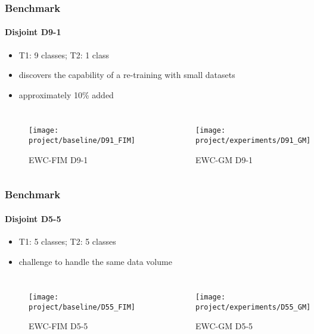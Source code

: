         \begin{frame}
            \frametitle{Benchmark}
            \framesubtitle{Disjoint D9-1}

            \begin{itemize}
                \item T1: 9 classes; T2: 1 class
                \item discovers the capability of a re-training with small datasets
                \item approximately 10\% added
            \end{itemize}

            \begin{columns}
                \begin{figure}[H]
                    \centering
                    \texttt{[image: project/baseline/D91\_FIM]}
                    \caption{EWC-FIM D9-1}
                    \label{fig:ewc_fim_d91}
                \end{figure}
                \begin{figure}[H]
                    \centering
                    \texttt{[image: project/experiments/D91\_GM]}
                    \caption{EWC-GM D9-1}
                    \label{fig:ewc_gm_d91}
                \end{figure}
            \end{columns}
        \end{frame}

        \begin{frame}
            \frametitle{Benchmark}
            \framesubtitle{Disjoint D5-5}
            
            \begin{itemize}
                \item T1: 5 classes; T2: 5 classes
                \item challenge to handle the same data volume
            \end{itemize}

            \begin{columns}
                \begin{figure}[H]
                    \centering
                    \texttt{[image: project/baseline/D55\_FIM]}
                    \caption{EWC-FIM D5-5}
                    \label{fig:ewc_fim_d55}
                \end{figure}
                \begin{figure}[H]
                    \centering
                    \texttt{[image: project/experiments/D55\_GM]}
                    \caption{EWC-GM D5-5}
                    \label{fig:ewc_gm_d55}
                \end{figure}
            \end{columns}
        \end{frame}

